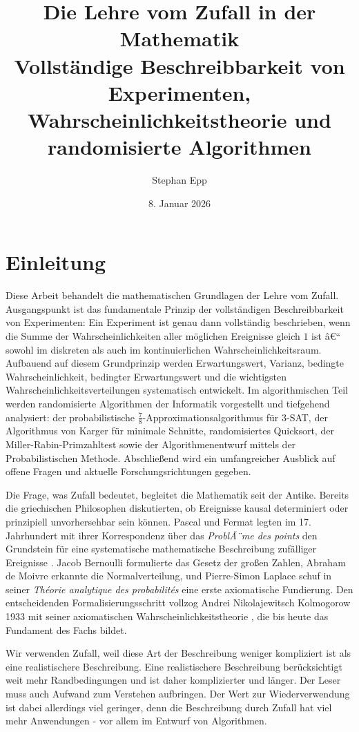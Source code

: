 ﻿\documentclass[12pt,a4paper]{article}
\title{\textbf{Die Lehre vom Zufall in der Mathematik} \\[-0.1em]
\large Vollständige Beschreibbarkeit von Experimenten,\\
	Wahrscheinlichkeitstheorie und randomisierte Algorithmen}
\author{Stephan Epp}
\date{8. Januar 2026}
\theoremstyle{definition}
\theoremstyle{plain}
\theoremstyle{remark}
\begin{document}
\maketitle
\tableofcontents
\newpage

\section{Einleitung}
Diese Arbeit behandelt die mathematischen Grundlagen der Lehre vom Zufall.
Ausgangspunkt ist das fundamentale Prinzip der vollständigen Beschreibbarkeit
von Experimenten: Ein Experiment ist genau dann vollständig beschrieben, wenn
die Summe der Wahrscheinlichkeiten aller möglichen Ereignisse gleich $1$ ist â€“
sowohl im diskreten als auch im kontinuierlichen Wahrscheinlichkeitsraum.
Aufbauend auf diesem Grundprinzip werden Erwartungswert, Varianz,
bedingte Wahrscheinlichkeit, bedingter Erwartungswert und die wichtigsten
Wahrscheinlichkeitsverteilungen systematisch entwickelt. Im algorithmischen
Teil werden randomisierte Algorithmen der Informatik vorgestellt und tiefgehend
analysiert: der probabilistische $\frac{7}{8}$-Approximationsalgorithmus für
3-SAT, der Algorithmus von Karger für minimale Schnitte, randomisiertes
Quicksort, der Miller-Rabin-Primzahltest sowie der Algorithmenentwurf mittels
der Probabilistischen Methode. Abschließend wird ein umfangreicher Ausblick
auf offene Fragen und aktuelle Forschungsrichtungen gegeben.

Die Frage, was Zufall bedeutet, begleitet die Mathematik seit der Antike.
Bereits die griechischen Philosophen diskutierten, ob Ereignisse kausal
determiniert oder prinzipiell unvorhersehbar sein können. Pascal und Fermat
legten im 17. Jahrhundert mit ihrer Korrespondenz über das \emph{Prob\-lÃ¨me
des points} den Grundstein für eine systematische mathematische Beschreibung
zufälliger Ereignisse \cite{david1962games}. Jacob Bernoulli formulierte das
Gesetz der großen Zahlen, Abraham de Moivre erkannte die Normalverteilung,
und Pierre-Simon Laplace schuf in seiner \emph{Théorie analytique des
probabilités} \cite{laplace1812theorie} eine erste axiomatische Fundierung.
Den entscheidenden Formalisierungsschritt vollzog Andrei Nikolajewitsch
Kolmogorow 1933 mit seiner axiomatischen Wahrscheinlichkeitstheorie
\cite{kolmogorov1933grundbegriffe}, die bis heute das Fundament des
Fachs bildet.

Wir verwenden Zufall, weil diese Art der Beschreibung weniger kompliziert ist als eine realistischere Beschreibung. Eine realistischere Beschreibung berücksichtigt weit mehr Randbedingungen und ist daher komplizierter und länger. Der Leser muss auch Aufwand zum Verstehen aufbringen. Der Wert zur Wiederverwendung ist dabei allerdings viel geringer, denn die Beschreibung durch Zufall hat viel mehr Anwendungen - vor allem im Entwurf von Algorithmen.
\end{document}
